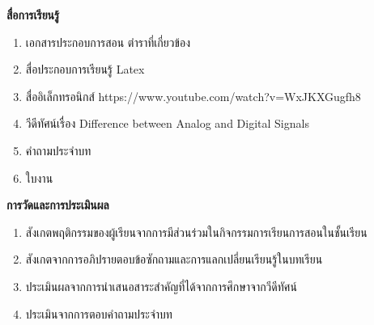 \newpage
\noindent
\textbf{\large สื่อการเรียนรู้}
\begin{enumerate}[topsep=0.5cm,itemsep=-1ex]
	\item เอกสารประกอบการสอน ตำราที่เกี่ยวข้อง
	\item สื่อประกอบการเรียนรู้ Latex
	\item สื่ออิเล็กทรอนิกส์ https://www.youtube.com/watch?v=WxJKXGugfh8

	\item วีดีทัศน์เรื่อง Difference between Analog and Digital Signals
	\item คำถามประจำบท
	\item ใบงาน
\end{enumerate}
\vspace{0.5cm}
\noindent
\textbf{\large การวัดและการประเมินผล}
\begin{enumerate}[topsep=0.5cm,itemsep=-1ex]
	\item สังเกตพฤติกรรมของผู้เรียนจากการมีส่วนร่วมในกิจกรรมการเรียนการสอนในชั้นเรียน
	\item สังเกตจากการอภิปรายตอบข้อซักถามและการแลกเปลี่ยนเรียนรู้ในบทเรียน
	\item ประเมินผลจากการนําเสนอสาระสำคัญที่ได้จากการศึกษาจากวีดีทัศน์
	\item ประเมินจากการตอบคําถามประจําบท
\end{enumerate}
